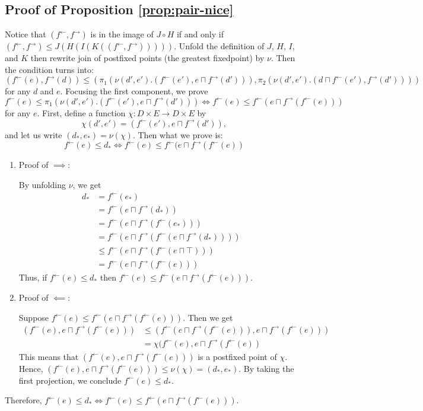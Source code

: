 \documentclass{llncs}
\newcommand{\ff}{{f^{\rightarrow}}}
\newcommand{\fb}{{f^{\leftarrow}}}
\newcommand{\meet}{\sqcap}
\newcommand{\comp}{\circ}
\begin{document}
\subsection{Proof of Proposition \ref{prop:pair-nice}}
Notice that $(\fb, \ff)$ is in the image of $J \comp H$ if and only if $(\fb, \ff) \leq J(H(I(K((\fb , \ff)))))$.
Unfold the definition of $J$, $H$, $I$, and $K$ then rewrite join of postfixed points (the greatest fixedpoint) by $\nu$. Then the condition turns into:
\[
  (\fb(e) , \ff(d)) \leq (\pi_{1}(\nu (d',e').(\fb(e') , e \meet \ff(d'))) , \pi_{2}(\nu (d',e').(d \meet \fb(e') , \ff(d'))))
\]
for any $d$ and $e$.
Focusing the first component, we prove
\[
  \fb(e) \leq \pi_{1} (\nu (d',e').(\fb(e') , e \meet \ff(d'))) \iff \fb(e) \leq \fb(e \meet \ff (\fb(e)))
\] for any $e$.
First, define a function $\chi : D \times E \to D \times E$ by
\[
  \chi(d' , e') = (\fb(e') , e \meet \ff(d')),
\]
and let us write $(d_{*} , e_{*}) = \nu(\chi)$.
Then what we prove is:
\[
  \fb(e) \leq d_{*} \iff \fb(e) \leq \fb(e \meet \ff (\fb(e))
\]
\begin{enumerate}[]
  \item{Proof of $\implies$:}

    By unfolding $\nu$, we get
    \begin{align*}
    d_{*} &= \fb(e_{*}) \\
          &= \fb(e \meet \ff(d_{*})) \\
          &= \fb(e \meet \ff(\fb(e_{*}))) \\
          &= \fb(e \meet \ff(\fb(e \meet \ff(d_{*})))) \\
          &\leq \fb(e \meet \ff(\fb(e \meet \top))) \\
          &= \fb(e \meet \ff(\fb(e)))
    \end{align*}
    Thus, if $\fb(e) \leq d_{*}$ then $\fb(e) \leq \fb(e \meet \ff(\fb(e)))$.

  \item{Proof of $\impliedby$:}

    Suppose $\fb(e) \leq \fb(e \meet \ff (\fb(e)))$. Then we get
    \begin{align*}
      (\fb(e) , e \meet \ff (\fb(e))) & \leq (\fb(e \meet \ff (\fb(e))) , e \meet \ff (\fb(e))) \\
                                      & = \chi(\fb(e) , e \meet \ff (\fb(e))
    \end{align*}
    This means that $(\fb(e) , e \meet \ff (\fb(e)))$ is a postfixed point of $\chi$.
    Hence, $(\fb(e) , e \meet \ff (\fb(e))) \leq \nu (\chi) = (d_{*} , e_{*})$.
    By taking the first projection, we conclude $\fb(e) \leq d_{*}$.
\end{enumerate}
Therefore, $\fb(e) \leq d_{*} \iff \fb(e) \leq \fb(e \meet \ff (\fb(e)))$.
\end{document}
